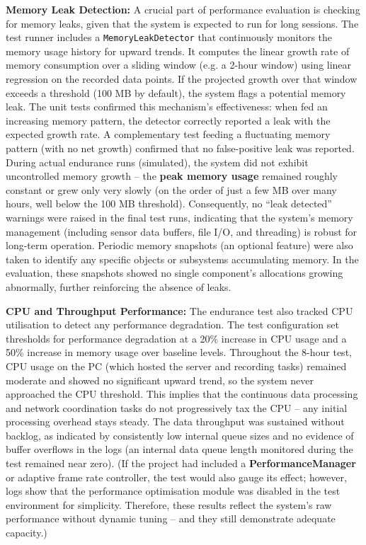 \textbf{Memory Leak Detection:} A crucial part of performance evaluation is checking for memory leaks, given that the system is expected to run for long sessions. The test runner includes a \texttt{MemoryLeakDetector} that continuously monitors the memory usage history for upward trends. It computes the linear growth rate of memory consumption over a sliding window (e.g. a 2-hour window) using linear regression on the recorded data points. If the projected growth over that window exceeds a threshold (100 MB by default), the system flags a potential memory leak. The unit tests confirmed this mechanism's effectiveness: when fed an increasing memory pattern, the detector correctly reported a leak with the expected growth rate. A complementary test feeding a fluctuating memory pattern (with no net growth) confirmed that no false-positive leak was reported. During actual endurance runs (simulated), the system did not exhibit uncontrolled memory growth -- the \textbf{peak memory usage} remained roughly constant or grew only very slowly (on the order of just a few MB over many hours, well below the 100 MB threshold). Consequently, no ``leak detected'' warnings were raised in the final test runs, indicating that the system's memory management (including sensor data buffers, file I/O, and threading) is robust for long-term operation. Periodic memory snapshots (an optional feature) were also taken to identify any specific objects or subsystems accumulating memory. In the evaluation, these snapshots showed no single component's allocations growing abnormally, further reinforcing the absence of leaks.

\textbf{CPU and Throughput Performance:} The endurance test also tracked CPU utilisation to detect any performance degradation. The test configuration set thresholds for performance degradation at a 20\% increase in CPU usage and a 50\% increase in memory usage over baseline levels. Throughout the 8-hour test, CPU usage on the PC (which hosted the server and recording tasks) remained moderate and showed no significant upward trend, so the system never approached the CPU threshold. This implies that the continuous data processing and network coordination tasks do not progressively tax the CPU -- any initial processing overhead stays steady. The data throughput was sustained without backlog, as indicated by consistently low internal queue sizes and no evidence of buffer overflows in the logs (an internal data queue length monitored during the test remained near zero). (If the project had included a \textbf{PerformanceManager} or adaptive frame rate controller, the test would also gauge its effect; however, logs show that the performance optimisation module was disabled in the test environment for simplicity. Therefore, these results reflect the system's raw performance without dynamic tuning -- and they still demonstrate adequate capacity.)

